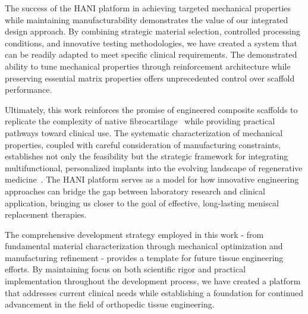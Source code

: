 The success of the HANI platform in achieving targeted mechanical properties while maintaining manufacturability demonstrates the value of our integrated design approach. By combining strategic material selection, controlled processing conditions, and innovative testing methodologies, we have created a system that can be readily adapted to meet specific clinical requirements. The demonstrated ability to tune mechanical properties through reinforcement architecture while preserving essential matrix properties offers unprecedented control over scaffold performance.

Ultimately, this work reinforces the promise of engineered composite scaffolds to replicate the complexity of native fibrocartilage~\cite{bulle2021humanmeniscus, abdelgaied2015comparisonbiomechanical} while providing practical pathways toward clinical use. The systematic characterization of mechanical properties, coupled with careful consideration of manufacturing constraints, establishes not only the feasibility but the strategic framework for integrating multifunctional, personalized implants into the evolving landscape of regenerative medicine~\cite{makris2011kneemeniscus}. The HANI platform serves as a model for how innovative engineering approaches can bridge the gap between laboratory research and clinical application, bringing us closer to the goal of effective, long-lasting meniscal replacement therapies.

The comprehensive development strategy employed in this work - from fundamental material characterization through mechanical optimization and manufacturing refinement - provides a template for future tissue engineering efforts. By maintaining focus on both scientific rigor and practical implementation throughout the development process, we have created a platform that addresses current clinical needs while establishing a foundation for continued advancement in the field of orthopedic tissue engineering.
